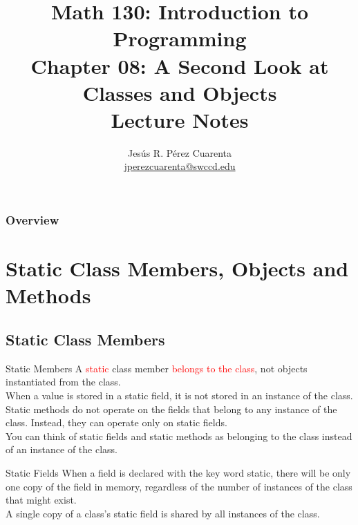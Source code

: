 \documentclass[11pt]{beamer}
\title[Chapter 08 Notes]{Math 130: Introduction to Programming \\ Chapter 08: A Second Look at Classes and Objects \\ Lecture Notes}
\author{Jesús R. Pérez Cuarenta \\
\href{mailto:jperezcuarenta@swccd.edu}{jperezcuarenta@swccd.edu}
}
\date{} %
\newcommand{\red}[1]{\textcolor{red}{#1}}
\begin{document}
% 
% 

\begin{frame}
  \maketitle
\end{frame}

\begin{frame}
\frametitle{Overview}
    \tableofcontents
\end{frame}

\section{Static Class Members, Objects and Methods}
\subsection{Static Class Members}
\begin{frame}[fragile]{Static Members}
    A \red{static} class member \red{belongs to the class}, not objects instantiated from the class.
    \\ \vspace{1em}
    When a value is stored in a static field, it is not stored in an instance of the class. 
    \\ \vspace{1em}
    Static methods do not operate on the fields that belong to any instance of the class. Instead, they can operate only on static fields.
    \\ \vspace{1em} 
    You can think of static fields and static methods as belonging to the class instead of an instance of the class. 
\end{frame}

\begin{frame}[fragile]{Static Fields}
    When a field is declared with the key word static, there will be only one copy of the field in memory, regardless of the number of instances of the class that might exist.
   \\ \vspace{1em}
    A single copy of a class’s static field is shared by all instances of the class.
\end{frame}
\end{document}
